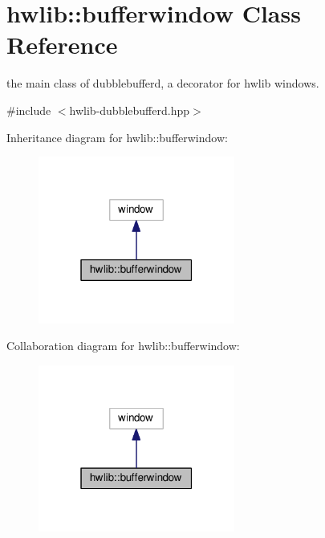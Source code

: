 \hypertarget{classhwlib_1_1bufferwindow}{\section{hwlib\+:\+:bufferwindow Class Reference}
\label{classhwlib_1_1bufferwindow}
}


the main class of dubblebufferd, a decorator for hwlib windows.  




{\ttfamily \#include $<$hwlib-\/dubblebufferd.\+hpp$>$}



Inheritance diagram for hwlib\+:\+:bufferwindow\+:
\nopagebreak
\begin{figure}[H]
\begin{center}
\leavevmode
\includegraphics[width=183pt]{classhwlib_1_1bufferwindow__inherit__graph}
\end{center}
\end{figure}


Collaboration diagram for hwlib\+:\+:bufferwindow\+:
\nopagebreak
\begin{figure}[H]
\begin{center}
\leavevmode
\includegraphics[width=183pt]{classhwlib_1_1bufferwindow__coll__graph}
\end{center}
\end{figure}
